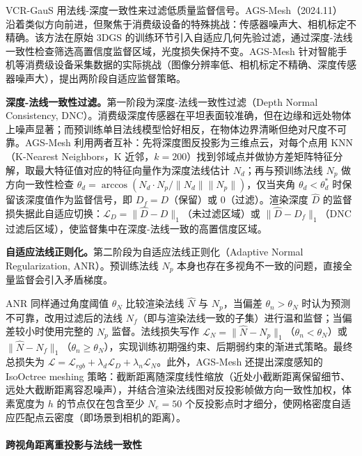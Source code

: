 VCR-GauS 用法线-深度一致性来过滤低质量监督信号。AGS-Mesh（2024.11）~\cite{2411_19271} 沿着类似方向前进，但聚焦于消费级设备的特殊挑战：传感器噪声大、相机标定不精确。该方法在原始 3DGS 的训练环节引入自适应几何先验过滤，通过深度-法线一致性检查筛选高置信度监督区域，光度损失保持不变。AGS-Mesh 针对智能手机等消费级设备采集数据的实际挑战（图像分辨率低、相机标定不精确、深度传感器噪声大），提出两阶段自适应监督策略。

\textbf{深度-法线一致性过滤。}第一阶段为深度-法线一致性过滤（Depth Normal Consistency, DNC）。消费级深度传感器在平坦表面较准确，但在边缘和远处物体上噪声显著；而预训练单目法线模型恰好相反，在物体边界清晰但绝对尺度不可靠。AGS-Mesh 利用两者互补：先将深度图反投影为三维点云，对每个点用 KNN（K-Nearest Neighbors，K 近邻，$k=200$）找到邻域点并做协方差矩阵特征分解，取最大特征值对应的特征向量作为深度法线估计 $N_d$；再与预训练法线 $N_p$ 做方向一致性检查 $\theta_d = \arccos(N_d \cdot N_p / \|N_d\| \|N_p\|)$，仅当夹角 $\theta_d < \theta_d^*$ 时保留该深度值作为监督信号，即 $D_f = D$（保留）或 $0$（过滤）。渲染深度 $\hat{D}$ 的监督损失据此自适应切换：$\mathcal{L}_D = \|\hat{D} - D\|_1$（未过滤区域）或 $\|\hat{D} - D_f\|_1$（DNC 过滤后区域），使监督集中在深度-法线一致的高置信度区域。

\textbf{自适应法线正则化。}第二阶段为自适应法线正则化（Adaptive Normal Regularization, ANR）。预训练法线 $N_p$ 本身也存在多视角不一致的问题，直接全量监督会引入矛盾梯度。

ANR 同样通过角度阈值 $\theta_N$ 比较渲染法线 $\hat{N}$ 与 $N_p$，当偏差 $\theta_n > \theta_N$ 时认为预测不可靠，改用过滤后的法线 $N_f$（即与渲染法线一致的子集）进行温和监督；当偏差较小时使用完整的 $N_p$ 监督。法线损失写作 $\mathcal{L}_N = \|\hat{N} - N_p\|_1$（$\theta_n < \theta_N$）或 $\|\hat{N} - N_f\|_1$（$\theta_n \geq \theta_N$），实现训练初期强约束、后期弱约束的渐进式策略。最终总损失为 $\mathcal{L} = \mathcal{L}_{rgb} + \lambda_d \mathcal{L}_D + \lambda_n \mathcal{L}_N$。此外，AGS-Mesh 还提出深度感知的 IsoOctree meshing 策略：截断距离随深度线性缩放（近处小截断距离保留细节、远处大截断距离容忍噪声），并结合渲染法线图对反投影帧做方向一致性加权，体素宽度为 $h$ 的节点仅在包含至少 $N_e = 50$ 个反投影点时才细分，使网格密度自适应匹配点云密度（即场景到相机的距离）。

\paragraph{跨视角距离重投影与法线一致性}

